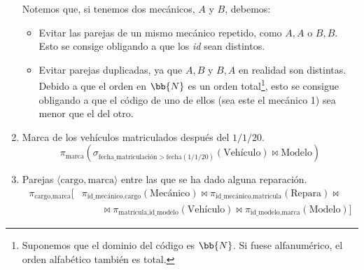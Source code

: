 \begin{ejercicio}
\begin{enumerate}
        Notemos que, si tenemos dos mecánicos, $A$ y $B$, debemos:
        \begin{itemize}
            \item Evitar las parejas de un mismo mecánico repetido, como $A,A$ o $B,B$. Esto se consige obligando a que los \emph{id} sean distintos.
            \item Evitar parejas duplicadas, ya que $A,B$ y $B,A$ en realidad son distintas. Debido a que el orden en $\bb{N}$ es un orden total\footnote{Suponemos que el dominio del código es $\bb{N}$. Si fuese alfanumérico, el orden alfabético también es total.}, esto se consigue obligando a que el código de uno de ellos (sea este el mecánico 1) sea menor que el del otro.
        \end{itemize}
        \item Marca de los vehículos matriculados después del $1/1/20$.
        \begin{equation*}
            \pi_{\text{marca}}(\sigma_{\text{fecha\_matriculación} > \text{fecha}(1/1/20)}(\text{Vehículo}) \bowtie \text{Modelo})
        \end{equation*}
        \item Parejas $\langle \text{cargo}, \text{marca} \rangle$ entre las que se ha dado alguna reparación.
        \begin{align*}
            \pi_{\text{cargo},\text{marca}}[&\pi_{\text{id\_mecánico},\text{cargo}}(\text{Mecánico})
            \bowtie \pi_{\text{id\_mecánico},\text{matrícula}}(\text{Repara})
            \bowtie\\&\qquad \bowtie \pi_{\text{matrícula},\text{id\_modelo}}(\text{Vehículo})
            \bowtie \pi_{\text{id\_modelo},\text{marca}}(\text{Modelo})]
        \end{align*}


\end{enumerate}
\end{ejercicio}
